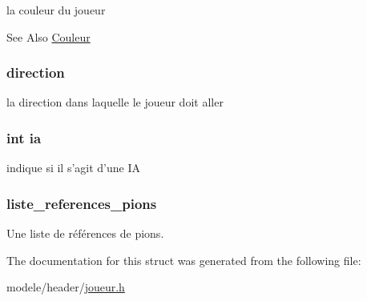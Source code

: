 la couleur du joueur 

\begin{DoxySeeAlso}{See Also}
\hyperlink{couleur_8h_a297c7f13df924dd6c731cb40f9fff63c}{Couleur} 
\end{DoxySeeAlso}
\hypertarget{struct_joueur_a53421c695d00016ab925777d423b4eb6}{
\subsubsection[{direction}]{ direction}}\label{struct_joueur_a53421c695d00016ab925777d423b4eb6}


la direction dans laquelle le joueur doit aller 

\hypertarget{struct_joueur_a2c924fc0836c91dc1e9f1c4c443f53a9}{
\subsubsection[{ia}]{\setlength{\rightskip}{0pt plus 5cm}int ia}}\label{struct_joueur_a2c924fc0836c91dc1e9f1c4c443f53a9}


indique si il s'agit d'une I\-A 

\hypertarget{struct_joueur_adf6743bc36a06d5fb27a8a32974d9db1}{
\subsubsection[{liste\-\_\-references\-\_\-pions}]{ liste\-\_\-references\-\_\-pions}}\label{struct_joueur_adf6743bc36a06d5fb27a8a32974d9db1}


Une liste de références de pions. 



The documentation for this struct was generated from the following file\-:\begin{DoxyCompactItemize}
\item 
modele/header/\hyperlink{joueur_8h}{joueur.\-h}\end{DoxyCompactItemize}
